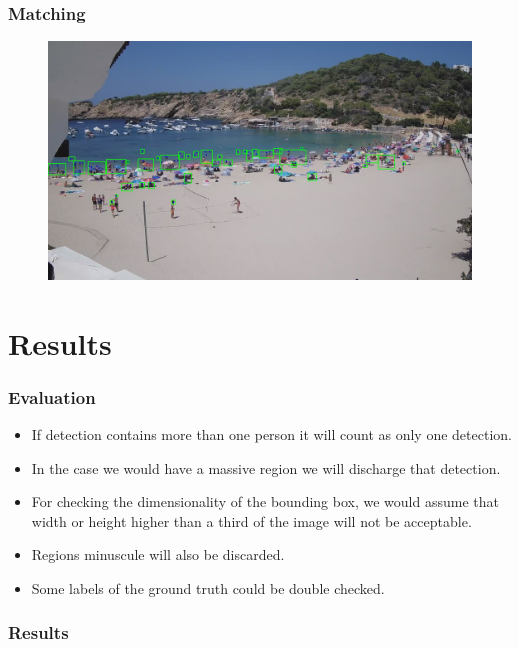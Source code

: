 \documentclass{beamer}
\begin{document}
\begin{frame}
    \frametitle{Matching}
    \begin{figure}
        \centering
        \includegraphics[width=\textwidth]{../gen/match/1660305600.jpg}
    \end{figure}
\end{frame}

\section{Results}

\begin{frame}
    \frametitle{Evaluation}
    \begin{itemize}
        
   
    \item If detection contains more than one person it will count as only one detection.
    \item In the case we would have a massive region we will discharge that detection.
    \item For checking the dimensionality of the bounding box, we would assume that width or height higher than a third of the image will not be acceptable.
    \item Regions minuscule will also be discarded.
    \item Some labels of the ground truth could be double checked.
\end{itemize}
\end{frame}

\begin{frame}
    \frametitle{Results}
\end{frame}
\end{document}
